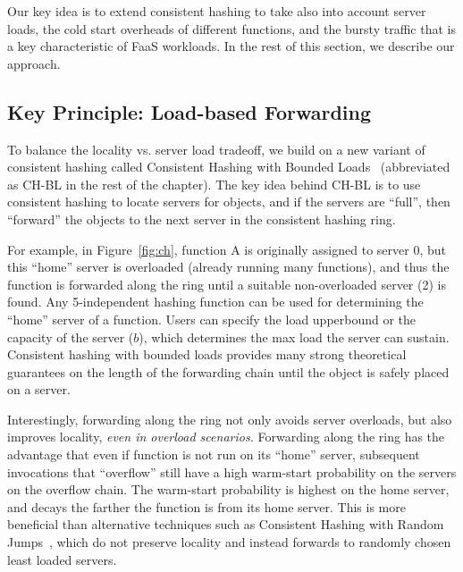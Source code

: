 Our key idea is to extend consistent hashing to take also into account server loads, the cold start overheads of different functions, and the bursty traffic that is a key characteristic of FaaS workloads.
In the rest of this section, we describe our approach. 


\subsection{Key Principle: Load-based Forwarding}

To balance the locality vs. server load tradeoff, we build on a new variant of consistent hashing called Consistent Hashing with Bounded Loads~\cite{mirrokni2018consistent} (abbreviated as CH-BL in the rest of the chapter).  
The key idea behind CH-BL is to use consistent hashing to locate servers for objects, and if the servers are ``full'', then ``forward'' the objects to the next server in the consistent hashing ring.

For example, in Figure~\ref{fig:ch}, function A is originally assigned to server 0, but this ``home'' server is overloaded (already running many functions), and thus the function is forwarded along the ring until a suitable non-overloaded server (2) is found. 
Any 5-independent hashing function can be used for determining the ``home'' server of a function. %
Users can specify the load upperbound or the capacity of the server ($b$), which determines the max load the server can sustain.  
Consistent hashing with bounded loads provides many strong theoretical guarantees on the length of the forwarding chain until the object is safely placed on a server. 


Interestingly, forwarding along the ring not only avoids server overloads, but also improves locality, \emph{even in overload scenarios.}
Forwarding along the ring has the advantage that even if function is not run on its ``home'' server, subsequent invocations that ``overflow'' still have a high warm-start probability on the servers on the overflow chain. %
The warm-start probability is highest on the home server, and decays the farther the function is from its home server. 
This is more beneficial than alternative techniques such as Consistent Hashing with Random Jumps~\cite{chrj-aaai21}, which do not preserve locality and instead forwards to randomly chosen least loaded servers. 

